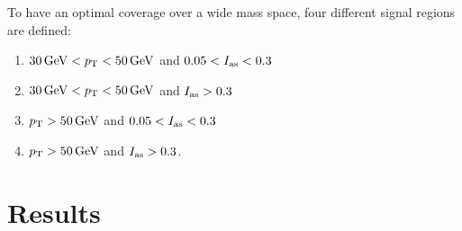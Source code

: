 To have an optimal coverage over a wide mass space, four different signal regions are defined:
\begin{enumerate}[1.)]
\item $30\gev<\pt<50\gev$ and $0.05<\ias<0.3$
\item $30\gev<\pt<50\gev$ and $\ias>0.3$
\item $\pt>50\gev$ and $0.05<\ias<0.3$
\item $\pt>50\gev$ and $\ias>0.3$.
\end{enumerate}

\chapter{Results}
\label{sec:Results}

